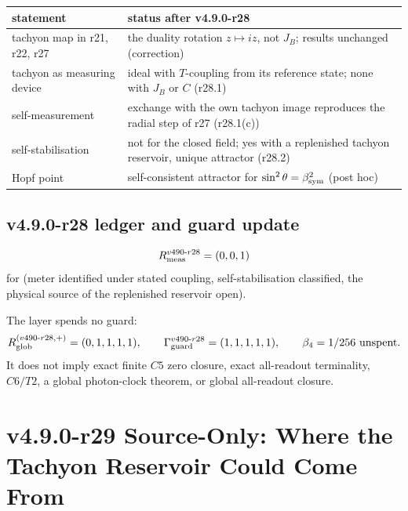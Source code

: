 \begin{center}
\small
\begin{tabular}{@{}>{\raggedright\arraybackslash}p{}>{\raggedright\arraybackslash}p{}@{}}
\toprule
statement & status after v4.9.0-r28\\
\midrule
tachyon map in r21, r22, r27 & the duality rotation \(z\mapsto iz\), not \(J_B\); results unchanged (correction)\\
tachyon as measuring device & ideal with \(T\)-coupling from its reference state; none with \(J_B\) or \(C\) (r28.1)\\
self-measurement & exchange with the own tachyon image reproduces the radial step of r27 (r28.1(c))\\
self-stabilisation & not for the closed field; yes with a replenished tachyon reservoir, unique attractor (r28.2)\\
Hopf point & self-consistent attractor for \(\sin^2\theta=\beta_{\mathrm{sym}}^2\) (post hoc)\\
\bottomrule
\end{tabular}
\end{center}

\subsection*{v4.9.0-r28 ledger and guard update}
\label{subsec:v490-r28-ledger-guard}

\[
R_{\rm meas}^{v490\text{-}r28}=(0,0,1)
\]
for (meter identified under stated coupling, self-stabilisation classified, the physical source of the replenished reservoir open).

The layer spends no guard:
\[
R_{\rm glob}^{(v490\text{-}r28,+)}=(0,1,1,1,1),
\qquad
\Gamma_{\rm guard}^{v490\text{-}r28}=(1,1,1,1,1),
\qquad
\beta_4=1/256\ \text{unspent}.
\]
It does not imply exact finite \(C5\) zero closure, exact all-readout terminality,
\(C6/T2\), a global photon-clock theorem, or global all-readout closure.

\clearpage
\section*{v4.9.0-r29 Source-Only: Where the Tachyon Reservoir Could Come From}
\label{sec:v490-r29-reservoir-source}

